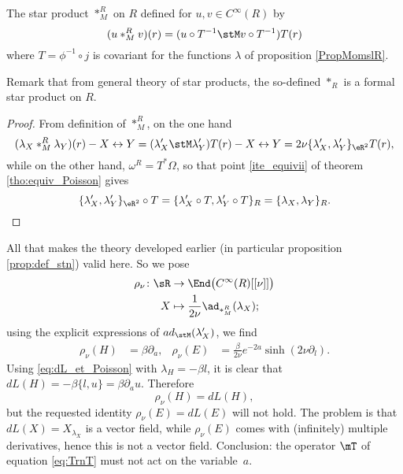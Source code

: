 \begin{corollary}
The star product $\ast_M^R$ on $R$ defined for $u,v\in C^{\infty}(R)$ by
\begin{equation}
  (u\ast_M^R v)(r)=( u\circ T^{-1}\stM v\circ T^{-1} )T(r)
\end{equation}
where $T=\phi^{-1}\circ j$ is covariant for the functions $\lambda$ of proposition \ref{PropMomslR}.

\end{corollary}
Remark that from general theory of star products, the so-defined $\ast_R$ is a formal star product on $R$.

\begin{proof}
From definition of $\ast_M^R$, on the one hand
\[ 
  (\lambda_X\ast_M^R \lambda_Y)(r)-X\leftrightarrow Y=(\lambda'_X\stM\lambda'_Y)T(r)-X\leftrightarrow Y
=2\nu\{  \lambda'_X,\lambda'_Y \}_{\eR^2}T(r),
\]
while on the other hand, $\omega^R=T^*\Omega$, so that point \ref{ite_equivii} of theorem \ref{tho:equiv_Poisson}  gives
\[ 
  \{ \lambda'_X,\lambda'_Y \}_{\eR^2}\circ T=\{ \lambda'_X\circ T,\lambda'_Y\circ T \}_R=\{ \lambda_X,\lambda_Y \}_R.
\]

\end{proof}

All that makes the theory developed earlier (in particular proposition \ref{prop:def_stn}) valid here. So we pose
\begin{equation}
\begin{aligned}
 {\rho_{\nu}}\colon\sR &\to {\End\big(  C^{\infty}(R)[ [\nu]] \big)} \\ 
  X &\mapsto {\frac{1}{2\nu}\ad_{\ast_M^R}(\lambda_X);} 
\end{aligned}
\end{equation}
using the explicit expressions of $ad_{\stM}(\lambda'_X)$, we find
\begin{align}
  \rho_{\nu}(H)&=\beta\partial_a,   &\rho_{\nu}(E)&=\frac{\beta}{2\nu}e^{-2a}\sinh(2\nu\partial_l).
\end{align}
Using \eqref{eq:dL_et_Poisson} with $\lambda_H=-\beta l$, it is clear that $dL(H)=-\beta\{l,u\}=\beta\partial_a u$. Therefore
\begin{equation}
   \rho_{\nu}(H)=dL(H),
\end{equation}
but the requested identity $\rho_{\nu}(E)=dL(E)$ will not hold. The problem is that $dL(X)=X_{\lambda_X}$ is a vector field, while $\rho_{\nu}(E)$ comes with (infinitely) multiple derivatives, hence this is not a vector field. Conclusion: the operator $\mT$ of equation \eqref{eq:TrnT} must not act on the variable~$a$.

